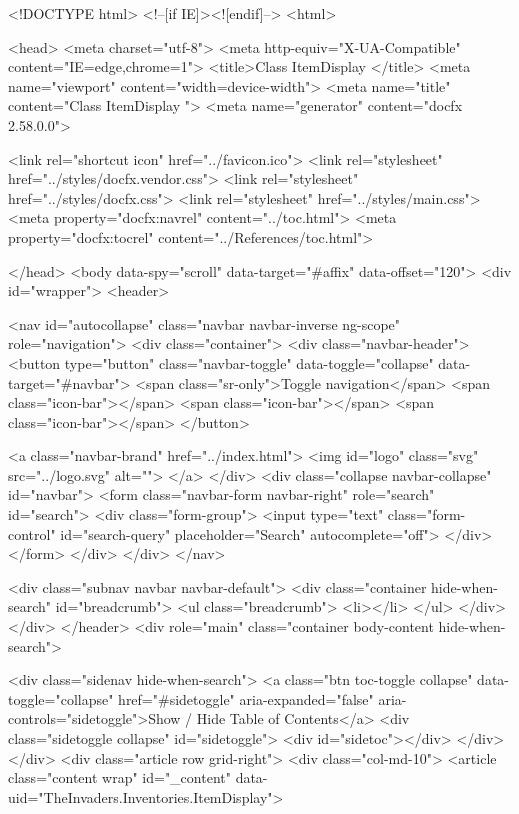 <!DOCTYPE html>
<!--[if IE]><![endif]-->
<html>
  
  <head>
    <meta charset="utf-8">
    <meta http-equiv="X-UA-Compatible" content="IE=edge,chrome=1">
    <title>Class ItemDisplay
   </title>
    <meta name="viewport" content="width=device-width">
    <meta name="title" content="Class ItemDisplay
   ">
    <meta name="generator" content="docfx 2.58.0.0">
    
    <link rel="shortcut icon" href="../favicon.ico">
    <link rel="stylesheet" href="../styles/docfx.vendor.css">
    <link rel="stylesheet" href="../styles/docfx.css">
    <link rel="stylesheet" href="../styles/main.css">
    <meta property="docfx:navrel" content="../toc.html">
    <meta property="docfx:tocrel" content="../References/toc.html">
    
    
    
  </head>
  <body data-spy="scroll" data-target="#affix" data-offset="120">
    <div id="wrapper">
      <header>
        
        <nav id="autocollapse" class="navbar navbar-inverse ng-scope" role="navigation">
          <div class="container">
            <div class="navbar-header">
              <button type="button" class="navbar-toggle" data-toggle="collapse" data-target="#navbar">
                <span class="sr-only">Toggle navigation</span>
                <span class="icon-bar"></span>
                <span class="icon-bar"></span>
                <span class="icon-bar"></span>
              </button>
              
              <a class="navbar-brand" href="../index.html">
                <img id="logo" class="svg" src="../logo.svg" alt="">
              </a>
            </div>
            <div class="collapse navbar-collapse" id="navbar">
              <form class="navbar-form navbar-right" role="search" id="search">
                <div class="form-group">
                  <input type="text" class="form-control" id="search-query" placeholder="Search" autocomplete="off">
                </div>
              </form>
            </div>
          </div>
        </nav>
        
        <div class="subnav navbar navbar-default">
          <div class="container hide-when-search" id="breadcrumb">
            <ul class="breadcrumb">
              <li></li>
            </ul>
          </div>
        </div>
      </header>
      <div role="main" class="container body-content hide-when-search">
        
        <div class="sidenav hide-when-search">
          <a class="btn toc-toggle collapse" data-toggle="collapse" href="#sidetoggle" aria-expanded="false" aria-controls="sidetoggle">Show / Hide Table of Contents</a>
          <div class="sidetoggle collapse" id="sidetoggle">
            <div id="sidetoc"></div>
          </div>
        </div>
        <div class="article row grid-right">
          <div class="col-md-10">
            <article class="content wrap" id="_content" data-uid="TheInvaders.Inventories.ItemDisplay">
  
